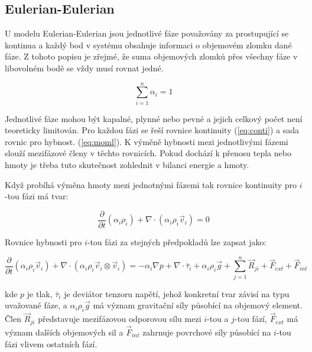\subsection{Eulerian-Eulerian}
U modelu Eulerian-Eulerian jsou jednotlivé fáze považovány za prostupující se kontinua a každý bod v systému obsahuje informaci o objemovém zlomku dané fáze. Z tohoto popisu je zřejmé, že suma objemových zlomků přes všechny fáze v libovolném bodě se vždy musí rovnat jedné. 

\begin{equation}
	\sum_{i=1}^n \alpha_{i} = 1
	\label{eq:volfrac}
\end{equation} 

\noindent Jednotlivé fáze mohou být kapalné, plynné nebo pevné a jejich celkový počet není teoreticky limitován. Pro každou fázi se řeší rovnice kontinuity (\ref{eq:conti}) a sada rovnic pro hybnost. (\ref{eq:moml}). K výměně hybnosti mezi jednotlivými fázemi slouží mezifázové členy v těchto rovnicích. Pokud dochází k přenosu tepla nebo hmoty je třeba tuto skutečnost zohlednit v bilanci energie a hmoty.    

Když probíhá výměna hmoty mezi jednotnými fázemi tak rovnice kontinuity pro $i$-tou fázi má tvar:

\begin{equation}
	\frac{\partial}{\partial t} (\alpha_{i}\rho_{i}) +  \nabla \cdot (\alpha_{i}\rho_{i}\vec{v}_{i}) = 0
	\label{eq:conti}
\end{equation}

\noindent Rovnice hybnosti pro $i$-tou fázi za stejných předpokladů lze zapsat jako:

\begin{equation}
	\frac{\partial}{\partial t} (\alpha_{i}\rho_{i}\vec{v}_{i}) + \nabla \cdot (\alpha_{i}\rho_{i} \vec{v}_{i} \otimes \vec{v}_{i}) = -\alpha_{i} \nabla p + \nabla \cdot \bar{\tau}_{i} + \alpha_{i}\rho_{i}\vec{g} + \sum_{j=1}^n \vec{R}_{ji} + \vec{F}_{ext} + \vec{F}_{int}
	\label{eq:moml}
\end{equation}

\noindent kde $p$ je tlak, $\bar{\tau}_{i}$ je deviátor tenzoru napětí, jehož konkretní tvar závisí na typu uvažované fáze, a $\alpha_{i}\rho_{i}\vec{g}$ má význam gravitační síly působící na objemový element. Člen $\vec{R}_{ji}$ představuje mezifázovou odporovou sílu mezi $i$-tou a $j$-tou fází, $\vec{F}_{ext}$ má význam dalších objemových sil a $\vec{F}_{int}$ zahrnuje povrchové síly působící na $i$-tou fázi vlivem ostatních fází. 

